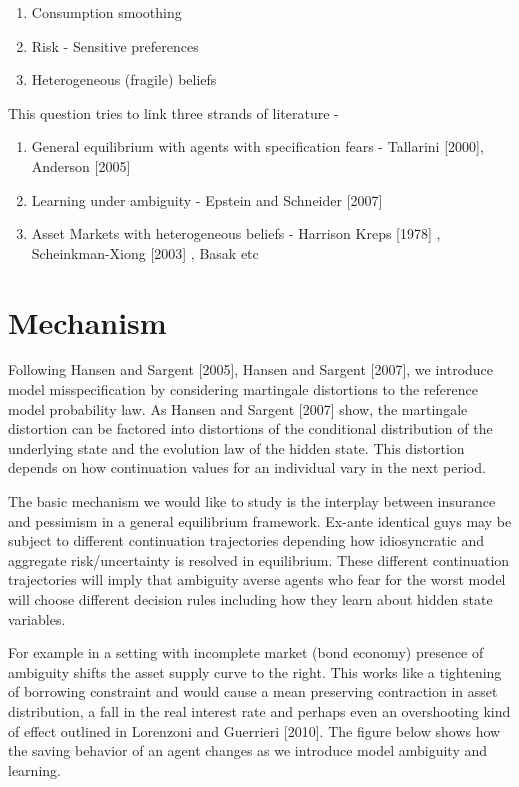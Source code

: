 \documentclass[a4paper,12pt]{article}
\begin{document}
\begin{enumerate}
	\item Consumption smoothing
	\item Risk - Sensitive preferences
	\item Heterogeneous (fragile) beliefs 
\end{enumerate}

\noindent This question tries to link three strands of literature -
\begin{enumerate}
	\item General equilibrium with agents with specification fears - Tallarini [2000], Anderson [2005]
	\item Learning under ambiguity -  Epstein and Schneider [2007]
	\item Asset Markets with heterogeneous beliefs - Harrison Kreps [1978] , Scheinkman-Xiong [2003] , Basak etc
\end{enumerate}
\section{Mechanism}
Following Hansen and Sargent [2005], Hansen and Sargent [2007], we introduce model misspecification by considering martingale distortions to the reference
model probability law. As Hansen and Sargent [2007] show, the martingale distortion can be factored into distortions of the conditional distribution of the underlying state and the evolution law of the hidden state. This distortion depends on how continuation values for an individual vary in the next period.

\noindent The basic mechanism we would like to study is the interplay between insurance and pessimism in a general equilibrium framework. Ex-ante identical guys may be subject to different continuation trajectories depending how idiosyncratic and aggregate risk/uncertainty is resolved in equilibrium. These different continuation trajectories will imply that ambiguity averse agents who fear for the worst model will choose different decision rules including how they learn about hidden state variables.

\noindent For example in a setting with incomplete market (bond economy) presence of ambiguity shifts the asset supply curve to the right. This works like a tightening of borrowing constraint and would cause a mean preserving contraction in asset distribution, a fall in the real interest rate and perhaps even an overshooting kind of effect outlined in Lorenzoni and Guerrieri [2010]. The figure below shows how the saving behavior of an agent changes as we introduce model ambiguity and learning.
\end{document}
